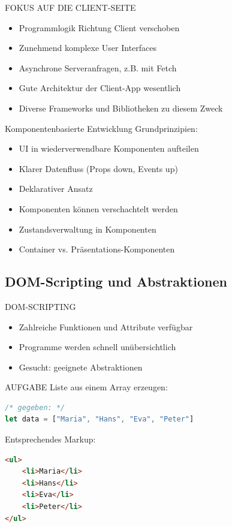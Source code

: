 \begin{definition}{FOKUS AUF DIE CLIENT-SEITE}
\begin{itemize}
  \item Programmlogik Richtung Client verschoben
  \item Zunehmend komplexe User Interfaces
  \item Asynchrone Serveranfragen, z.B. mit Fetch
  \item Gute Architektur der Client-App wesentlich
  \item Diverse Frameworks und Bibliotheken zu diesem Zweck
\end{itemize}
\end{definition}

\begin{concept}{Komponentenbasierte Entwicklung}
    Grundprinzipien:
    \begin{itemize}
        \item UI in wiederverwendbare Komponenten aufteilen
        \item Klarer Datenfluss (Props down, Events up)
        \item Deklarativer Ansatz
        \item Komponenten können verschachtelt werden
        \item Zustandsverwaltung in Komponenten
        \item Container vs. Präsentations-Komponenten
    \end{itemize}
\end{concept}

\pagebreak


\subsection{DOM-Scripting und Abstraktionen}

\begin{definition}{DOM-SCRIPTING}
\begin{itemize}
  \item Zahlreiche Funktionen und Attribute verfügbar
  \item Programme werden schnell unübersichtlich
  \item Gesucht: geeignete Abstraktionen
\end{itemize}
\end{definition}

\begin{definition}{AUFGABE}
Liste aus einem Array erzeugen:
\begin{lstlisting}[language=JavaScript, style=basesmol]
/* gegeben: */
let data = ["Maria", "Hans", "Eva", "Peter"]
\end{lstlisting}

Entsprechendes Markup:
\begin{lstlisting}[language=HTML, style=basesmol]
<ul>
    <li>Maria</li>
    <li>Hans</li>
    <li>Eva</li>
    <li>Peter</li>
</ul>
\end{lstlisting}
\end{definition}

